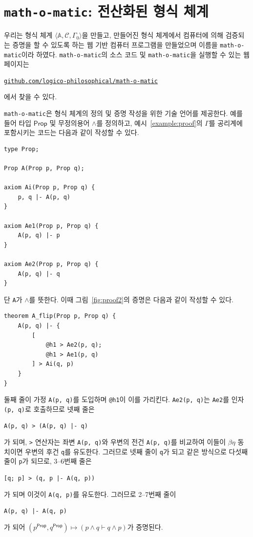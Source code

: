 \documentclass[10pt,twocolumn]{article}
\theoremstyle{definition}
\newcommand{\Prop}{\mathsf{Prop}}
\begin{document}
\section{\texttt{math-o-matic}: 전산화된 형식 체계}

우리는 형식 체계 $\langle\mathbb A, \mathcal C, \Gamma_0\rangle$을 만들고, 만들어진 형식 체계에서 컴퓨터에 의해 검증되는 증명을 할 수 있도록 하는 웹 기반 컴퓨터 프로그램을 만들었으며 이름을 \texttt{math-o-matic}이라 하였다. \texttt{math-o-matic}의 소스 코드 및 \texttt{math-o-matic}을 실행할 수 있는 웹 페이지는
\begin{center}
	\href{https://github.com/logico-philosophical/math-o-matic}{\texttt{github.com/logico-philosophical/math-o-matic}}
\end{center}
에서 찾을 수 있다.

\texttt{math-o-matic}은 형식 체계의 정의 및 증명 작성을 위한 기술 언어를 제공한다. 예를 들어 타입 $\Prop$ 및 무정의용어 $\land$를 정의하고, 예시~\ref{example:proof}의 $\Gamma$를 공리계에 포함시키는 코드는 다음과 같이 작성할 수 있다.

\begin{lstlisting}
type Prop;

Prop A(Prop p, Prop q);

axiom Ai(Prop p, Prop q) {
	p, q |- A(p, q)	
}

axiom Ae1(Prop p, Prop q) {
	A(p, q) |- p
}

axiom Ae2(Prop p, Prop q) {
	A(p, q) |- q	
}
\end{lstlisting}
단 \verb!A!가 $\land$를 뜻한다. 이때 그림~\ref{fig:proof2}의 증명은 다음과 같이 작성할 수 있다.
\begin{lstlisting}
theorem A_flip(Prop p, Prop q) {
	A(p, q) |- {
		[
			@h1 > Ae2(p, q);
			@h1 > Ae1(p, q)
		] > Ai(q, p)
	}
}
\end{lstlisting}
둘째 줄이 가정 \verb!A(p, q)!를 도입하며 \verb!@h1!이 이를 가리킨다. \verb!Ae2(p, q)!는 \verb!Ae2!를 인자 \verb!(p, q)!로 호출하므로 넷째 줄은
\begin{center}
	\verb!A(p, q) > (A(p, q) |- q)!
\end{center}
가 되며, \verb!>! 연산자는 좌변 \verb!A(p, q)!와 우변의 전건 \verb!A(p, q)!를 비교하여 이들이 $\beta\eta$ 동치이면 우변의 후건 \verb!q!를 유도한다. 그러므로 넷째 줄이 \verb!q!가 되고 같은 방식으로 다섯째 줄이 \verb!p!가 되므로, 3--6번째 줄은
\begin{center}
	\verb![q; p] > (q, p |- A(q, p))!
\end{center}
가 되며 이것이 \verb!A(q, p)!를 유도한다. 그러므로 2--7번째 줄이
\begin{center}
	\verb!A(p, q) |- A(q, p)!
\end{center}
가 되어 $(p^\Prop, q^\Prop)\mapsto (p\land q\vdash q\land p)$가 증명된다.
\end{document}
